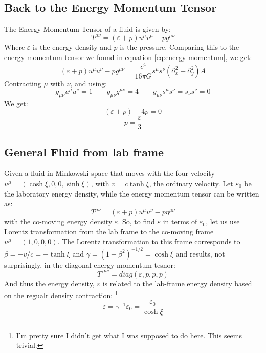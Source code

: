 \documentclass{article}
\begin{document}
\subsection{Back to the Energy Momentum Tensor}
The Energy-Momentum Tensor of a fluid is given by:
\begin{equation}
    T^{\mu\nu} = (\varepsilon + p)u^\mu v^\mu - pg^{\mu\nu}
\end{equation}
Where $\varepsilon$ is the energy density and $p$ is the pressure. Comparing this to the energy-momentum tensor we found in equation \ref{eq:energy-momentum}, we get:
\begin{equation}
\label{eq:em-tensors}
    (\varepsilon + p)u^\mu u^\nu - pg^{\mu\nu} = \frac{c^4}{16 \pi G}s^\mu s^\nu \left(\partial_x^2 + \partial_y^2\right) A
\end{equation}
Contracting $\mu$ with $\nu$, and using:
\begin{equation}
    g_{\mu\nu}u^\mu u^\nu = 1
    \qquad
    g_{\mu\nu}g^{\mu\nu} = 4
    \qquad
    g_{\mu\nu}s^\mu s^\nu = s_\nu s^\nu = 0
\end{equation}
We get:
\begin{equation}
    (\varepsilon + p) - 4p = 0
\end{equation}
\begin{equation}
    p = \frac{\varepsilon}{3}
\end{equation}

\subsection{General Fluid from lab frame}
Given a fluid in Minkowski space that moves with the four-velocity $u^\mu = (\cosh\xi, 0, 0, \sinh \xi)$, with $v = c\tanh\xi$, the ordinary velocity. Let $\varepsilon_0$ be the laboratory energy density, while the energy momentum tensor can be written as:
\begin{equation}
    T^{\mu\nu} = (\varepsilon + p)u^\mu u^\nu - p\eta^{\mu\nu}
\end{equation}
with the co-moving energy density $\varepsilon$. So, to find $\varepsilon$ in terms of $\varepsilon_0$, let us use Lorentz transformation from the lab frame to the co-moving frame $u^\mu = (1, 0, 0, 0)$. The Lorentz transformation to this frame corresponds to $\beta = -v/c = -\tanh \xi$ and $\gamma = (1 - \beta^2)^{-1/2} = \cosh \xi$ and results, not surprisingly, in the diagonal energy-momentum tesnor:
\begin{equation}
    T'^{\mu\nu} = diag(\varepsilon, p, p, p)
\end{equation}
And thus the energy density, $\varepsilon$ is related to the lab-frame energy density based on the regualr density contraction:
\footnote{I'm pretty sure I didn't get what I was supposed to do here. This seems trivial.}
\begin{equation}
    \varepsilon = \gamma^{-1}\varepsilon_0 = \frac{\varepsilon_0}{\cosh\xi}
\end{equation}
\end{document}
